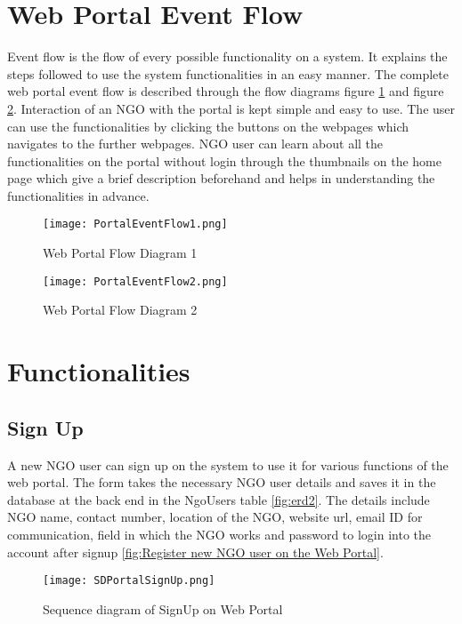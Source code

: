 \section{Web Portal Event Flow}
Event flow is the flow of every possible functionality on a system. It explains the steps followed to use the system functionalities in an easy manner.
The complete web portal event flow is described through the flow diagrams figure \ref{fig:Web Portal Flow Diagram 1} and figure \ref{fig:Web Portal Flow Diagram 2}. Interaction of an NGO with the portal is kept simple and easy to use. The user can use the functionalities by clicking the buttons on the webpages which navigates to the further webpages. NGO user can learn about all the functionalities on the portal without login through the thumbnails on the home page which give a brief description beforehand and helps in understanding the functionalities in advance.

\begin{figure}[H]
    \centering
	\texttt{[image: PortalEventFlow1.png]}
    \caption{ Web Portal Flow Diagram 1}
    \label{fig:Web Portal Flow Diagram 1}
\end{figure} 

\begin{figure}[H]
    \centering
	\texttt{[image: PortalEventFlow2.png]}
    \caption{ Web Portal Flow Diagram 2}
    \label{fig:Web Portal Flow Diagram 2}
\end{figure} 
 

\section{Functionalities}

\subsection{Sign Up}
A new NGO user can sign up on the system to use it for various functions of the web portal. The form takes the necessary NGO user details and saves it in the database at the back end in the NgoUsers table \ref{fig:erd2}. The details include NGO name, contact number, location of the NGO, website url, email ID for communication, field in which the NGO works and password to login into the account after signup \ref{fig:Register new NGO user on the Web Portal}.

\begin{figure}[H]
    \centering
	\texttt{[image: SDPortalSignUp.png]}
    \caption{Sequence diagram of SignUp on Web Portal}
    \label{fig:Sequence diagram of SignUp on Web Portal}
\end{figure}

